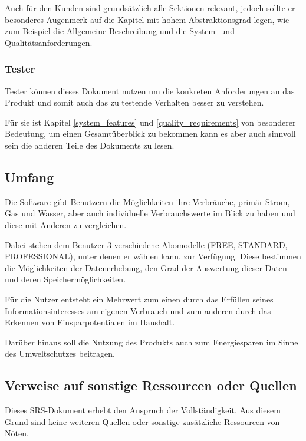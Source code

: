 Auch für den Kunden sind grundsätzlich alle Sektionen relevant, jedoch sollte er besonderes Augenmerk auf die Kapitel mit hohem Abstraktionsgrad legen,
wie zum Beispiel die Allgemeine Beschreibung und die System- und Qualitätsanforderungen.

\subsubsection{Tester}

Tester können dieses Dokument nutzen um die konkreten Anforderungen an das Produkt und somit auch das zu testende Verhalten besser zu verstehen. 

Für sie ist Kapitel \ref{system_features} und \ref{quality_requirements} von besonderer Bedeutung, um einen Gesamtüberblick zu bekommen kann es aber auch sinnvoll sein die anderen Teile des Dokuments zu lesen.

\subsection{Umfang}

Die Software gibt Benutzern die Möglichkeiten ihre Verbräuche, primär Strom, Gas und Wasser, aber auch individuelle Verbrauchswerte im Blick zu haben und diese mit Anderen zu vergleichen.


Dabei stehen dem Benutzer 3 verschiedene Abomodelle (FREE, STANDARD, PROFESSIONAL), unter denen er wählen kann, zur Verfügung.
Diese bestimmen die Möglichkeiten der Datenerhebung, den Grad der Auswertung dieser Daten und deren Speichermöglichkeiten.

Für die Nutzer entsteht ein Mehrwert zum einen durch das Erfüllen seines Informationsinteresses am eigenen Verbrauch und zum anderen durch das Erkennen von Einsparpotentialen im Haushalt.

Darüber hinaus soll die Nutzung des Produkts auch zum Energiesparen im Sinne des Umweltschutzes beitragen.

\subsection{Verweise auf sonstige Ressourcen oder Quellen}

Dieses SRS-Dokument erhebt den Anspruch der Vollständigkeit. Aus diesem Grund sind keine weiteren Quellen oder sonstige zusätzliche Ressourcen von Nöten.
